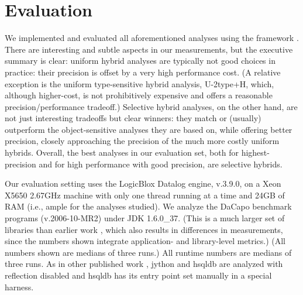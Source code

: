 
\section{Evaluation}
\label{sec:evaluation}

We implemented and evaluated all aforementioned analyses using the
\doop{} framework \cite{BS-OOPSLA09}. There are interesting and
subtle aspects in our measurements, but the executive summary is
clear: uniform hybrid analyses are typically not good choices in
practice: their precision is offset by a very high performance cost.
(A relative exception is the uniform type-sensitive hybrid analysis,
U-2type+H, which, although higher-cost, is not prohibitively expensive
and offers a reasonable precision/performance tradeoff.)  Selective
hybrid analyses, on the other hand, are not just interesting tradeoffs
but clear winners: they match or (usually) outperform the
object-sensitive analyses they are based on, while offering better
precision, closely approaching the precision of the much more costly
uniform hybrids. Overall, the best analyses in our evaluation set,
both for highest-precision and for high performance with good
precision, are selective hybrids.

Our evaluation setting uses the LogicBlox Datalog engine, v.3.9.0, on
a Xeon X5650 2.67GHz machine with only one thread running at a time
and 24GB of RAM (i.e., ample for the analyses studied). We analyze the
DaCapo benchmark programs (v.2006-10-MR2) under JDK 1.6.0\_37. (This
is a much larger set of libraries than earlier work
\cite{BS-OOPSLA09,pointsto-popl11}, which also results in differences
in measurements, since the numbers shown integrate application- and
library-level metrics.) (All numbers shown are medians of three runs.)
All runtime numbers are medians of three runs. As in other published
work \cite{pointsto-popl11,lhotak-callgraph12}, jython and hsqldb are
analyzed with reflection disabled and hsqldb has its entry point set
manually in a special harness.


